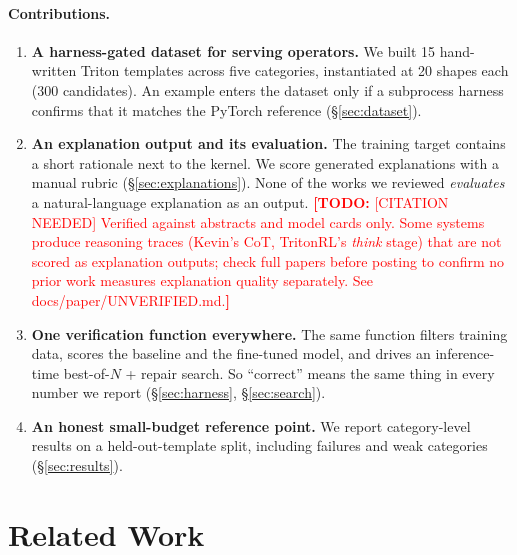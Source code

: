\documentclass[11pt]{article}
\newcommand{\todo}[1]{\textcolor{red}{\textbf{[TODO:} #1\textbf{]}}}
\begin{document}
\paragraph{Contributions.}
\begin{enumerate}
  \item \textbf{A harness-gated dataset for serving operators.} We built 15 hand-written Triton
        templates across five categories, instantiated at 20 shapes each (300 candidates). An
        example enters the dataset only if a subprocess harness confirms that it matches the
        PyTorch reference (\S\ref{sec:dataset}).
  \item \textbf{An explanation output and its evaluation.} The training target contains a short
        rationale next to the kernel. We score generated explanations with a manual rubric
        (\S\ref{sec:explanations}). None of the works we reviewed \emph{evaluates} a
        natural-language explanation as an output.%
        \todo{[CITATION NEEDED] Verified against abstracts and model cards only. Some systems
        produce reasoning traces (Kevin's CoT, TritonRL's \emph{think} stage) that are not
        scored as explanation outputs; check full papers before posting to confirm no prior
        work measures explanation quality separately. See docs/paper/UNVERIFIED.md.}
  \item \textbf{One verification function everywhere.} The same function filters training data,
        scores the baseline and the fine-tuned model, and drives an inference-time best-of-$N$ +
        repair search. So ``correct'' means the same thing in every number we report
        (\S\ref{sec:harness}, \S\ref{sec:search}).
  \item \textbf{An honest small-budget reference point.} We report category-level results on a
        held-out-template split, including failures and weak categories (\S\ref{sec:results}).
\end{enumerate}

\section{Related Work}
\label{sec:related}
\end{document}
